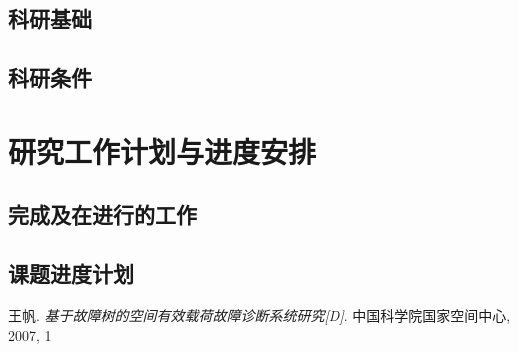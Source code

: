 \documentclass[a4paper,11pt]{article}
\begin{document}
		\subsection{科研基础}
		\subsection{科研条件}
	\section{研究工作计划与进度安排}
		\subsection{完成及在进行的工作}
		\subsection{课题进度计划}
	\newpage
	\renewcommand{\refname}{参~考~文~献}
	\begin{thebibliography}{9}
	 王帆. \emph{基于故障树的空间有效载荷故障诊断系统研究[D]}. 中国科学院国家空间中心, 2007, 1
	\end{thebibliography}
\end{document}
